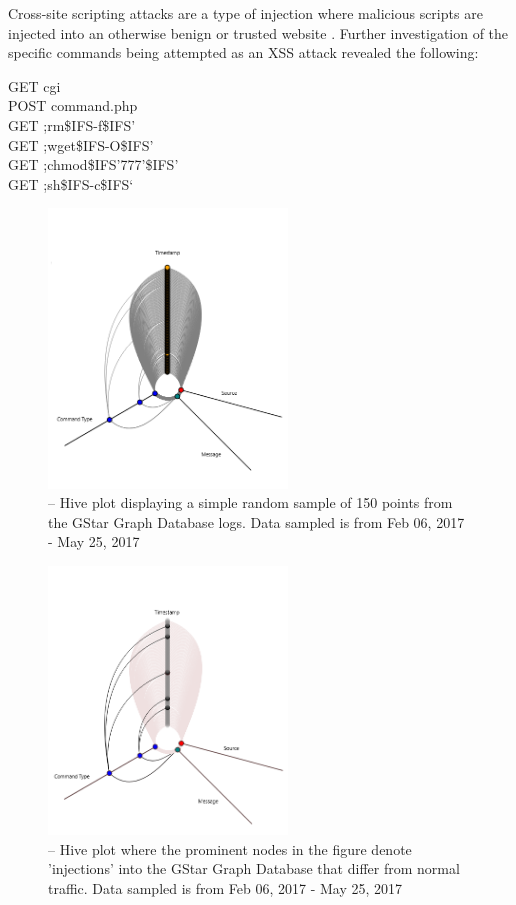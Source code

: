 Cross-site scripting attacks are a type of injection where malicious scripts are injected into an otherwise benign or trusted website \cite{XSS-def}. Further investigation of the specific commands being attempted as an XSS attack revealed the following:

\noindent GET cgi\\
POST command.php\\
GET ;rm\$IFS-f\$IFS’\\
GET ;wget\$IFS-O\$IFS’\\
GET ;chmod\$IFS’777’\$IFS’\\
GET ;sh\$IFS-c\$IFS‘

\begin{figure}[h]
\centering
\includegraphics[width=2.5in]{images/regHive.png} 
\caption{-- Hive plot displaying a simple random sample of 150 points from the GStar Graph Database logs. Data sampled is from Feb 06, 2017 - May 25, 2017}
\label{fig:regHive}
\end{figure}

\begin{figure}[h]
\centering
\includegraphics[width=2.5in]{images/uniqHive.png} 
\caption{-- Hive plot where the prominent nodes in the figure denote 'injections' into the GStar Graph Database that differ from normal traffic. Data sampled is from Feb 06, 2017 - May 25, 2017}
\label{fig:uniqHive}
\end{figure}

